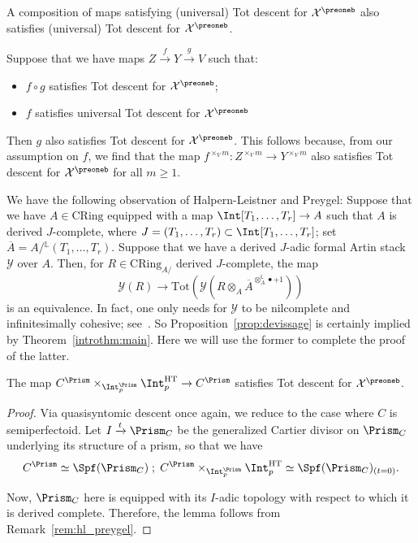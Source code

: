 \documentclass[10pt]{amsart}
\begin{document}
\begin{remark}
\label{rem:composition_tot_descent}
A composition of maps satisfying (universal) Tot descent for $\mathcal{X}^\preoneb$ also satisfies (universal) Tot descent for $\mathcal{X}^\preoneb$. 
\end{remark}   

\begin{remark}
\label{rem:composition_tot_descent_flat}
Suppose that we have maps $Z\xrightarrow{f}Y\xrightarrow{g}V$ such that:
\begin{itemize}
   \item $f\circ g$ satisfies Tot descent for $\mathcal{X}^\preoneb$;
   \item $f$ satisfies universal Tot descent for $\mathcal{X}^\preoneb$
\end{itemize}
Then $g$ also satisfies Tot descent for $\mathcal{X}^\preoneb$. This follows because, from our assumption on $f$, we find that the map $f^{\times_Vm}: Z^{\times_V m}\to Y^{\times_V m}$ also satisfies Tot descent for $\mathcal{X}^\preoneb$ for all $m\ge 1$.
\end{remark}   


\begin{remark}
\label{rem:hl_preygel}
We have the following observation of Halpern-Leistner and Preygel: Suppose that we have $A\in \mathrm{CRing}$ equipped with a map $\Int[T_1,\ldots,T_r]\to A$ such that $A$ is derived $J$-complete, where $J = (T_1,\ldots,T_r)\subset \Int[T_1,\ldots,T_r]$; set $\overline{A} = A/{}^{\mathbb{L}}(T_1,\ldots,T_r)$. Suppose that we have a derived $J$-adic formal Artin stack $\mathcal{Y}$ over $A$. Then, for $R\in \mathrm{CRing}_{A/}$ derived $J$-complete, the map
\[
\mathcal{Y}(R) \to \mathrm{Tot}\left(\mathcal{Y}(R\otimes_{A} \overline{A}^{\otimes^{\mathbb{L}}_{A}\bullet +1})\right)
\]
is an equivalence. In fact, one only needs for $\mathcal{Y}$ to be nilcomplete and infinitesimally cohesive; see~\cite[Cor. 3.1.4]{MR4560539}. So Proposition~\ref{prop:devissage} is certainly implied by Theorem~\ref{introthm:main}. Here we will use the former to complete the proof of the latter.
\end{remark}


\begin{lemma}
\label{lem:reduction_to_HT_locus}
The map $C^\Prism\times_{\Int_p^\Prism}\Int_p^{\mathrm{HT}}\to C^\Prism$ satisfies Tot descent for $\mathcal{X}^\preoneb$.
\end{lemma}
\begin{proof}
Via quasisyntomic descent once again, we reduce to the case where $C$ is semiperfectoid. Let $I\xrightarrow{t}\Prism_C$ be the generalized Cartier divisor on $\Prism_C$ underlying its structure of a prism, so that we have
\[
C^\Prism \simeq \Spf(\Prism_C)\;;\; C^\Prism\times_{\Int_p^\Prism}\Int_p^{\mathrm{HT}} \simeq \Spf(\Prism_C)_{(t=0)}.
\]

Now, $\Prism_C$ here is equipped with its $I$-adic topology with respect to which it is derived complete. Therefore, the lemma follows from Remark~\ref{rem:hl_preygel}.
\end{proof} 
\end{document}
